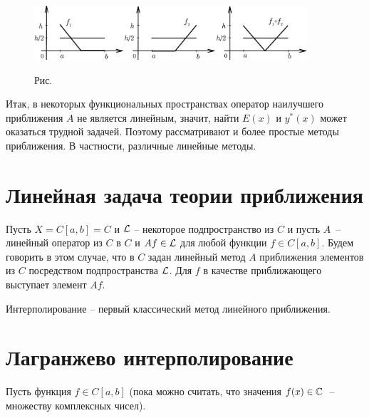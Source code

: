 \begin{figure}[ht]
\begin{center}
\includegraphics[width=0.9\textwidth]{pict/pict01-3.eps}
\end{center}
 \bigskip
 \label{r1-3}

 \centerline{Рис.~\theris}
 \bigskip
\end{figure}





Итак, в некоторых функциональных пространствах {оператор наилучшего} {приближения}
$A$ не является линейным, значит,
{найти} $E{(x)}$ и $y^*{(x)}$ {может} {оказаться трудной задачей. Поэтому рассматривают и
более простые методы} {приближения. В частности, различные линейные методы.}

\section{Линейная задача теории приближения}

Пусть $X=C[a,b]=C$ и $\mathcal{L}$ -- некоторое {подпространство} из $C$ и пусть $A$~--
линейный оператор из $C$ в $C$ и {$Af \in \mathcal{L}$} для любой функции $f \in C[a,b].$
Будем говорить в этом случае, что в $C$ задан линейный метод $A$ приближения элементов
{из} $C$ посредством подпространства $\mathcal{L}$. {Для $f$ в качестве приближающего
выступает элемент $Af$.}

Интерполирование -- первый классический метод линейного приближения.

\section{Лагранжево интерполирование}

Пусть функция $f \in C[a,b]$ (пока можно считать, что значения $f(x) \in \mathbb{C}$~--
множеству комплексных чисел).

